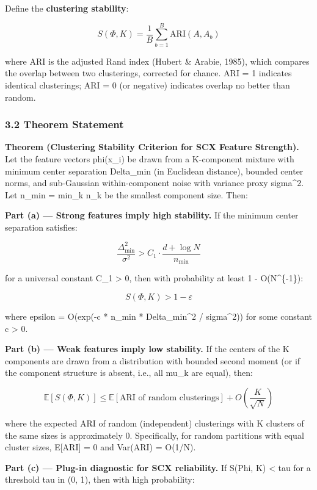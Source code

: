 \documentclass[
  12pt,
]{ctexart}
\begin{document}
Define the \textbf{clustering stability}:

\[S(\Phi, K) = \frac{1}{B} \sum_{b=1}^B \text{ARI}(A, A_b)\]

where ARI is the adjusted Rand index (Hubert \& Arabie, 1985), which
compares the overlap between two clusterings, corrected for chance. ARI
= 1 indicates identical clusterings; ARI = 0 (or negative) indicates
overlap no better than random.

\subsubsection{3.2 Theorem Statement}\label{theorem-statement}

\textbf{Theorem (Clustering Stability Criterion for SCX Feature
Strength).} Let the feature vectors phi(x\_i) be drawn from a
K-component mixture with minimum center separation Delta\_min (in
Euclidean distance), bounded center norms, and sub-Gaussian
within-component noise with variance proxy sigma\^{}2. Let n\_min =
min\_k n\_k be the smallest component size. Then:

\textbf{Part (a) --- Strong features imply high stability.} If the
minimum center separation satisfies:

\[\frac{\Delta_{\min}^2}{\sigma^2} > C_1 \cdot \frac{d + \log N}{n_{\min}}\]

for a universal constant C\_1 \textgreater{} 0, then with probability at
least 1 - O(N\^{}\{-1\}):

\[S(\Phi, K) > 1 - \varepsilon\]

where epsilon = O(exp(-c * n\_min * Delta\_min\^{}2 / sigma\^{}2)) for
some constant c \textgreater{} 0.

\textbf{Part (b) --- Weak features imply low stability.} If the centers
of the K components are drawn from a distribution with bounded second
moment (or if the component structure is absent, i.e., all mu\_k are
equal), then:

\[\mathbb{E}[S(\Phi, K)] \leq \mathbb{E}[\text{ARI of random clusterings}] + O\left(\frac{K}{\sqrt{N}}\right)\]

where the expected ARI of random (independent) clusterings with K
clusters of the same sizes is approximately 0. Specifically, for random
partitions with equal cluster sizes, E{[}ARI{]} = 0 and Var(ARI) =
O(1/N).

\textbf{Part (c) --- Plug-in diagnostic for SCX reliability.} If S(Phi,
K) \textless{} tau for a threshold tau in (0, 1), then with high
probability:
\end{document}
